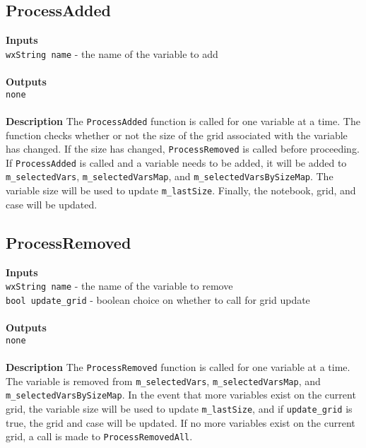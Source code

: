 \documentclass[11pt]{article} %
\begin{document}
\subsection{ProcessAdded}
\textbf{Inputs} \\
\texttt{wxString name} - the name of the variable to add \\
\\
\textbf{Outputs}\\
\texttt{none} \\
\\
\textbf{Description}
The \texttt{ProcessAdded} function is called for one variable at a time. The function checks whether or not the size of the grid associated with the variable has changed.  If the size has changed, \texttt{ProcessRemoved} is called before proceeding. If \texttt{ProcessAdded} is called and a variable needs to be added, it will be added to \texttt{m\_selectedVars}, \texttt{m\_selectedVarsMap}, and \texttt{m\_selectedVarsBySizeMap}. The variable size will be used to update \texttt{m\_lastSize}.  Finally, the notebook, grid, and case will be updated.

\subsection{ProcessRemoved}
\textbf{Inputs} \\
\texttt{wxString name} - the name of the variable to remove \\
\texttt{bool update\_grid} - boolean choice on whether to call for grid update \\
\\
\textbf{Outputs}\\
\texttt{none} \\
\\
\textbf{Description}
The \texttt{ProcessRemoved} function is called for one variable at a time. The variable is removed from \texttt{m\_selectedVars}, \texttt{m\_selectedVarsMap}, and \texttt{m\_selectedVarsBySizeMap}. In the event that more variables exist on the current grid, the variable size will be used to update \texttt{m\_lastSize}, and if \texttt{update\_grid} is true, the grid and case will be updated.  If no more variables exist on the current grid, a call is made to \texttt{ProcessRemovedAll}.
\end{document}
